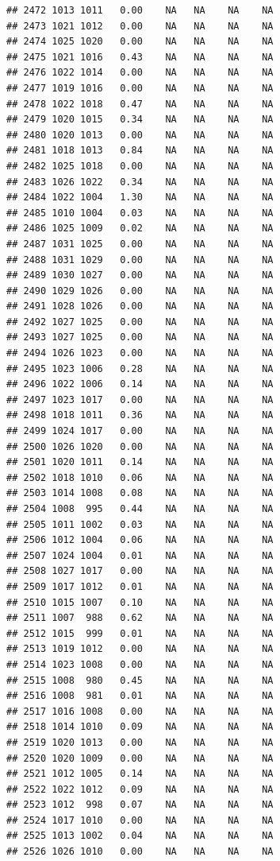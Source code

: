 \documentclass{article}\usepackage{graphicx, color}
\makeatletter
\newenvironment{kframe}{%
 \def\at@end@of@kframe{}%
 \ifinner\ifhmode%
  \def\at@end@of@kframe{\end{minipage}}%
  \begin{minipage}{\columnwidth}%
 \fi\fi%
 \def\FrameCommand##1{\hskip\@totalleftmargin \hskip-\fboxsep
 \colorbox{shadecolor}{##1}\hskip-\fboxsep
     \hskip-\linewidth \hskip-\@totalleftmargin \hskip\columnwidth}%
 \MakeFramed {\advance\hsize-\width
   \@totalleftmargin\z@ \linewidth\hsize
   \@setminipage}}%
 {\par\unskip\endMakeFramed%
 \at@end@of@kframe}
\newenvironment{knitrout}{}{} %
\makeatother
\begin{document}
\begin{knitrout}
\begin{kframe}
\begin{verbatim}
## 2472 1013 1011   0.00    NA   NA    NA    NA
## 2473 1021 1012   0.00    NA   NA    NA    NA
## 2474 1025 1020   0.00    NA   NA    NA    NA
## 2475 1021 1016   0.43    NA   NA    NA    NA
## 2476 1022 1014   0.00    NA   NA    NA    NA
## 2477 1019 1016   0.00    NA   NA    NA    NA
## 2478 1022 1018   0.47    NA   NA    NA    NA
## 2479 1020 1015   0.34    NA   NA    NA    NA
## 2480 1020 1013   0.00    NA   NA    NA    NA
## 2481 1018 1013   0.84    NA   NA    NA    NA
## 2482 1025 1018   0.00    NA   NA    NA    NA
## 2483 1026 1022   0.34    NA   NA    NA    NA
## 2484 1022 1004   1.30    NA   NA    NA    NA
## 2485 1010 1004   0.03    NA   NA    NA    NA
## 2486 1025 1009   0.02    NA   NA    NA    NA
## 2487 1031 1025   0.00    NA   NA    NA    NA
## 2488 1031 1029   0.00    NA   NA    NA    NA
## 2489 1030 1027   0.00    NA   NA    NA    NA
## 2490 1029 1026   0.00    NA   NA    NA    NA
## 2491 1028 1026   0.00    NA   NA    NA    NA
## 2492 1027 1025   0.00    NA   NA    NA    NA
## 2493 1027 1025   0.00    NA   NA    NA    NA
## 2494 1026 1023   0.00    NA   NA    NA    NA
## 2495 1023 1006   0.28    NA   NA    NA    NA
## 2496 1022 1006   0.14    NA   NA    NA    NA
## 2497 1023 1017   0.00    NA   NA    NA    NA
## 2498 1018 1011   0.36    NA   NA    NA    NA
## 2499 1024 1017   0.00    NA   NA    NA    NA
## 2500 1026 1020   0.00    NA   NA    NA    NA
## 2501 1020 1011   0.14    NA   NA    NA    NA
## 2502 1018 1010   0.06    NA   NA    NA    NA
## 2503 1014 1008   0.08    NA   NA    NA    NA
## 2504 1008  995   0.44    NA   NA    NA    NA
## 2505 1011 1002   0.03    NA   NA    NA    NA
## 2506 1012 1004   0.06    NA   NA    NA    NA
## 2507 1024 1004   0.01    NA   NA    NA    NA
## 2508 1027 1017   0.00    NA   NA    NA    NA
## 2509 1017 1012   0.01    NA   NA    NA    NA
## 2510 1015 1007   0.10    NA   NA    NA    NA
## 2511 1007  988   0.62    NA   NA    NA    NA
## 2512 1015  999   0.01    NA   NA    NA    NA
## 2513 1019 1012   0.00    NA   NA    NA    NA
## 2514 1023 1008   0.00    NA   NA    NA    NA
## 2515 1008  980   0.45    NA   NA    NA    NA
## 2516 1008  981   0.01    NA   NA    NA    NA
## 2517 1016 1008   0.00    NA   NA    NA    NA
## 2518 1014 1010   0.09    NA   NA    NA    NA
## 2519 1020 1013   0.00    NA   NA    NA    NA
## 2520 1020 1009   0.00    NA   NA    NA    NA
## 2521 1012 1005   0.14    NA   NA    NA    NA
## 2522 1022 1012   0.09    NA   NA    NA    NA
## 2523 1012  998   0.07    NA   NA    NA    NA
## 2524 1017 1010   0.00    NA   NA    NA    NA
## 2525 1013 1002   0.04    NA   NA    NA    NA
## 2526 1026 1010   0.00    NA   NA    NA    NA

\end{verbatim}
\end{kframe}
\end{knitrout}
\end{document}
